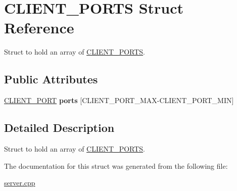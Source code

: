 \hypertarget{structCLIENT__PORTS}{
\section{CLIENT\_\-PORTS Struct Reference}
\label{structCLIENT__PORTS}
}


Struct to hold an array of \hyperlink{structCLIENT__PORTS}{CLIENT\_\-PORTS}.  
\subsection*{Public Attributes}
\begin{DoxyCompactItemize}
\item 
\hypertarget{structCLIENT__PORTS_a3fb0488f3d7be5fba3723f3165e9e9f2}{
\hyperlink{structCLIENT__PORT}{CLIENT\_\-PORT} {\bfseries ports} \mbox{[}CLIENT\_\-PORT\_\-MAX-\/CLIENT\_\-PORT\_\-MIN\mbox{]}}
\label{structCLIENT__PORTS_a3fb0488f3d7be5fba3723f3165e9e9f2}

\end{DoxyCompactItemize}


\subsection{Detailed Description}
Struct to hold an array of \hyperlink{structCLIENT__PORTS}{CLIENT\_\-PORTS}. 

The documentation for this struct was generated from the following file:\begin{DoxyCompactItemize}
\item 
\hyperlink{server_8cpp}{server.cpp}\end{DoxyCompactItemize}
